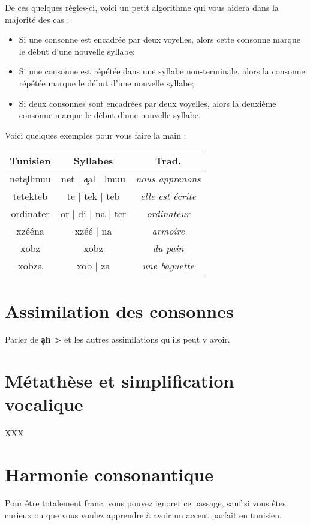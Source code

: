De ces quelques règles-ci, voici un petit algorithme qui vous aidera dans la majorité des cas :
\begin{itemize}
    \item Si une consonne est encadrée par deux voyelles, alors cette consonne marque le début d'une nouvelle syllabe;
    \item Si une consonne est répétée dans une syllabe non-terminale, alors la consonne répétée marque le début d'une nouvelle syllabe;
    \item Si deux consonnes sont encadrées par deux voyelles, alors la deuxième consonne marque le début d'une nouvelle syllabe.
\end{itemize}

Voici quelques exemples pour vous faire la main :

\begin{center}
    \begin{tabular}{||c | c | c||} 
    \hline
    \textbf{Tunisien} & \textbf{Syllabes} & \textbf{Trad.}\\
    \hline\hline
    net\c{a}llmuu & net | \c{a}al | lmuu & \textit{nous apprenons}\\ 
    \hline
    tetekteb & te | tek | teb & \textit{elle est écrite}\\ 
    \hline
    ordinater & or | di | na | ter & \textit{ordinateur}\\ 
    \hline
    xzééna & xzéé | na & \textit{armoire}\\ 
    \hline
    xobz & xobz & \textit{du pain}\\ 
    \hline
    xobza & xob | za & \textit{une baguette}\\ 
    \hline
   \end{tabular}
\end{center}

\section{Assimilation des consonnes}\label{Assimilation}
Parler de \textbf{\c{a}h > \textcrh\textcrh} et les autres assimilations qu'ils peut y avoir.

\section{Métathèse et simplification vocalique}
XXX

\section{Harmonie consonantique}
Pour être totalement franc, vous pouvez ignorer ce passage, sauf si vous êtes curieux ou que vous voulez apprendre à avoir un accent parfait en tunisien. 

